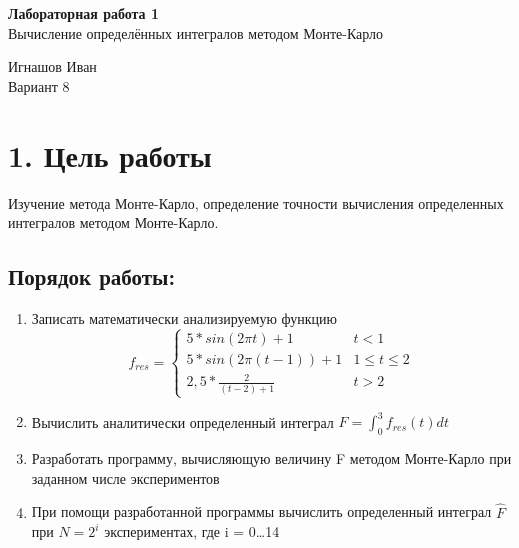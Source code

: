 \documentclass[12pt]{article}
\begin{document}
\begin{center}
	\LARGE 
	\textbf{Лабораторная работа 1}\\
	Вычисление определённых интегралов методом Монте-Карло\\
\end{center}

\begin{flushright}
	\large
	Игнашов Иван\\
	Вариант 8\\
\end{flushright}

\newpage

 \section*{1. Цель работы}
Изучение метода Монте-Карло, определение точности вычисления определенных интегралов методом Монте-Карло.

\subsection*{Порядок работы:}
\begin{enumerate}
	\item Записать математически анализируемую функцию 
		\begin{equation}
			f_{res} = \begin{cases}
						5*sin(2 \pi t) + 1 &t < 1\\
						5*sin(2 \pi (t-1)) + 1 &1 \le t \le 2\\
						2,5* \frac{2}{(t-2) + 1} &t > 2
					  \end{cases}
		\end{equation}
	\item Вычислить аналитически определенный интеграл $F = \int_0^3 f_{res}(t)dt$
	\item Разработать программу, вычисляющую величину F методом Монте-Карло при
заданном числе экспериментов
	\item При помощи разработанной программы вычислить определенный интеграл $\hat{F}$ %
 при $N = 2^i$ экспериментах, где i = 0\dots14
\end{enumerate}

\newpage
\end{document}
